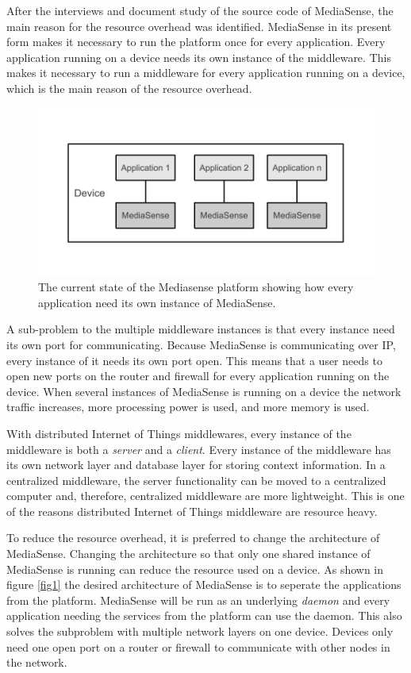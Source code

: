 After the interviews and document study of the source code of MediaSense, the main reason for the resource overhead was identified. MediaSense in its present form makes it necessary to run the platform once for every application. Every application running on a device needs its own instance of the middleware. This makes it necessary to run a middleware for every application running on a device, which is the main reason of the resource overhead. 

\begin{figure}[h!]
		\centering
    	\includegraphics[scale=0.75]{part_4/result_and_analysis/mediasense_arch_old.pdf}
		\caption{The current state of the Mediasense platform showing how every application need its own instance of MediaSense.} 
\end{figure}

A sub-problem to the multiple middleware instances is that every instance need its own port for communicating. Because MediaSense is communicating over IP, every instance of it needs its own port open. This means that a user needs to open new ports on the router and firewall for every application running on the device. When several instances of MediaSense is running on a device the network traffic increases, more processing power is used, and more memory is used. 

With distributed Internet of Things middlewares, every instance of the middleware is both a \emph{server} and a \emph{client}. Every instance of the middleware has its own network layer and database layer for storing context information. In a centralized middleware, the server functionality can be moved to a centralized computer and, therefore, centralized middleware are more lightweight. This is one of the reasons distributed Internet of Things middleware are resource heavy. 

To reduce the resource overhead, it is preferred to change the architecture of MediaSense. Changing the architecture so that only one shared instance of MediaSense is running can reduce the resource used on a device. As shown in figure \ref{fig1} the desired architecture of MediaSense is to seperate the applications from the platform. MediaSense will be run as an underlying  \emph{daemon} and every application needing the services from the platform can use the daemon. This also solves the subproblem with multiple network layers on one device. Devices only need one open port on a router or firewall to communicate with other nodes in the network.  

